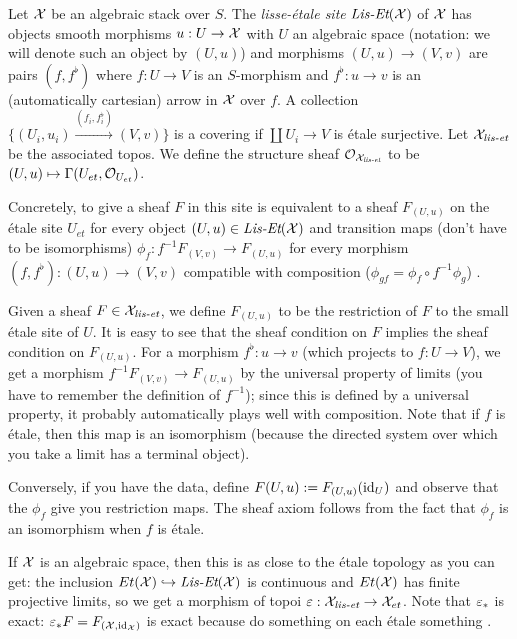 \begin{definition}
  Let $\mathcal{X}$ be an algebraic stack over $S$. The \emph{lisse-\'etale
site} $\text{\it Lis-Et}(\mathcal{X})$ of $\mathcal{X}$ has objects smooth morphisms $u:U\to \mathcal{X}$
with $U$ an algebraic space (notation: we will denote such an object
by $(U,u)$) and morphisms $(U,u)\to (V,v)$ are pairs $(f,f^\flat)$
where $f:U\to V$ is an $S$-morphism and $f^\flat:u\to v$ is an
(automatically cartesian) arrow in $\mathcal{X}$ over $f$. A collection
$\{(U_i,u_i)\xrightarrow{(f_i,f_i^\flat)} (V,v)\}$ is a covering if
$\coprod U_i\to V$ is \'etale surjective. Let $\mathcal{X}_{\text{\it lis-et}} $ be the
associated topos. We define the structure sheaf $\mathcal{O}_{\mathcal{X}_{\text{\it lis-et}} }$ to
be $(U,u)\mapsto \Gamma(U_{et},\mathcal{O}_{U_{et}})$.
\end{definition}
\begin{remark}
  Concretely, to give a sheaf $F$ in this site is equivalent to a
sheaf $F_{(U,u)}$ on the \'etale site $U_{et}$ for every object
$(U,u)\in \text{\it Lis-Et}(\mathcal{X})$ and transition maps (don't have to be
isomorphisms) $\phi_f:f^{-1}F_{(V,v)}\to F_{(U,u)}$ for every
morphism $(f,f^\flat):(U,u)\to (V,v)$ compatible with composition
($\phi_{gf}=\phi_f \circ f^{-1}\phi_{g}$) .

   Given a sheaf $F\in
\mathcal{X}_{\text{\it lis-et}}$, we define $F_{(U,u)}$ to be the restriction of $F$ to the
small \'etale site of $U$. It is easy to see that the sheaf condition
on $F$ implies the sheaf condition on $F_{(U,u)}$. For a morphism
$f^\flat:u\to v$ (which projects to $f:U\to V$), we get a morphism
$f^{-1}F_{(V,v)}\to F_{(U,u)}$ by the universal property of limits
(you have to remember the definition of $f^{-1}$); since this is
defined by a universal property, it probably automatically plays well
with composition. Note that if $f$ is \'etale, then this map is an
isomorphism (because the directed system over which you take a limit
has a terminal object).

  Conversely, if you have the data, define $F(U,u):=F_{(U,u)}(\operatorname{id}_U)$
and observe that the $\phi_f$ give you restriction maps. The sheaf
axiom follows from the fact that $\phi_f$ is an isomorphism when $f$
is \'etale. 
\end{remark}
\begin{remark}
  If $\mathcal{X}$ is an algebraic space, then this is as close to the \'etale
topology as you can get: the inclusion $Et(\mathcal{X})\hookrightarrow
\text{\it Lis-Et}(\mathcal{X})$ is continuous and $Et(\mathcal{X})$ has finite projective limits,
so we get a morphism of topoi $\varepsilon:\mathcal{X}_{\text{\it lis-et}} \to \mathcal{X}_{et}$. Note that
$\varepsilon_*$ is exact: $\varepsilon_*F=F_{(\mathcal{X},\operatorname{id}_{\mathcal{X}})}$ is exact because do
something on each \'etale something \anton{}.
\end{remark}

